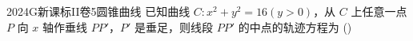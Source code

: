 
\begin{problem}{2024}{G}{新课标II卷}{5}{圆锥曲线}
已知曲线 $C: x^2+y^2=16(y>0)$，从 $C$ 上任意一点 $P$ 向 $x$ 轴作垂线 $PP'$，$P'$ 是垂足，则线段 $PP'$ 的中点的轨迹方程为
(\hspace{1cm})
\begin{choices}[2]
\end{choices}
\end{problem}